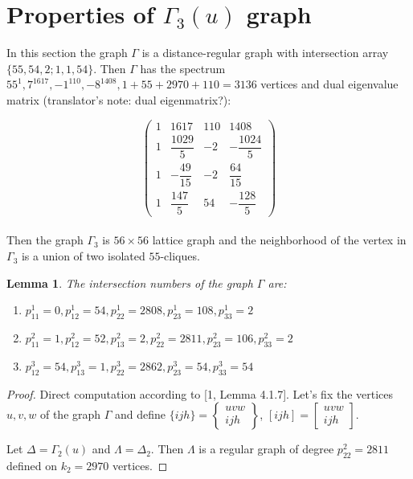\documentclass{article}
\newtheorem{lemma}{Lemma}
\theoremstyle{definition}
\theoremstyle{definition}
\theoremstyle{remark}
\begin{document}
\section{Properties of $\Gamma_3(u)$ graph}

In this section the graph $\Gamma$ is a distance-regular graph with intersection array $\{55, 54, 2; 1, 1, 54\}$. Then $\Gamma$ has the spectrum $55^1, 7^{1617}, -1^{110}, -8^{1408}, 1 + 55 + 2970 + 110 = 3136$ vertices and dual eigenvalue matrix (translator's note: dual eigenmatrix?):

\renewcommand{\arraystretch}{2.2}
\[
\begin{pmatrix}
    1 & 1617 & 110 & 1408 \\
    1 & \dfrac{1029}{5} & -2 & -\dfrac{1024}{5} \\
    1 & -\dfrac{49}{15} & -2 & \dfrac{64}{15} \\
    1 & \dfrac{147}{5} & 54 & -\dfrac{128}{5}
\end{pmatrix}
\]
\renewcommand{\arraystretch}{1.0}
\\

Then the graph $\Gamma_3$ is $56 \times 56$ lattice graph and the neighborhood of the vertex in $\Gamma_3$ is a union of two isolated $55$-cliques.

\begin{lemma}The intersection numbers of the graph $\Gamma$ are:
    \begin{enumerate}
	\item $p_{11}^1 = 0, p_{12}^1 = 54, p_{22}^1 = 2808, p_{23}^1 = 108, p_{33}^1 = 2$
	\item $p_{11}^2 = 1, p_{12}^2 = 52, p_{13}^2 = 2, p_{22}^2 = 2811, p_{23}^2 = 106, p_{33}^2 = 2$
	\item $p_{12}^3 = 54, p_{13}^3 = 1, p_{22}^3 = 2862, p_{23}^3 = 54, p_{33}^3 = 54$
    \end{enumerate}
\end{lemma}

\begin{proof} Direct computation according to [1, Lemma 4.1.7].
    Let's fix the vertices $u,v,w$ of the graph $\Gamma$ and define
$ \{ijh\} = \begin{Bmatrix} uvw \\ ijh \end{Bmatrix}$,
$ [ijh] = \begin{bmatrix} uvw \\ ijh \end{bmatrix}$.

Let $\Delta = \Gamma_2(u)$ and $\Lambda = \Delta_2$. Then $\Lambda$ is a regular graph of degree $p^2_{22} = 2811$ defined on $k_2 = 2970$ vertices.
\end{proof}
\end{document}
